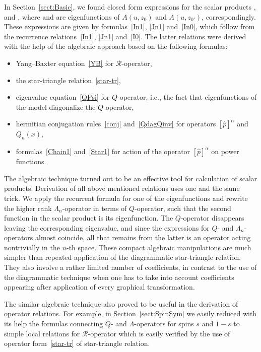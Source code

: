 \documentclass[10pt,a4paper]{amsart}
\numberwithin{equation}{section}
\begin{document}
In Section~\ref{sect:Basic}, we found closed form expressions for the scalar products
,
 and ,
where  and  are eigenfunctions of $A(u,z_0)$ and $A(u,z_{0'})$, correspondingly. These expressions are given by formulas~\eqref{In1}, \eqref{Jn1} and~\eqref{In0}, which follow from the
recurrence relations~\eqref{In1}, \eqref{Jn1} and~\eqref{I0}. The latter relations were derived with the help of the algebraic approach based on the following formulas:
\begin{itemize}\itemsep=0pt
	\item Yang--Baxter equation~\eqref{YB} for $\mathcal{R}$-operator,
	\item the star-triangle relation~\eqref{star-tr},
	\item eigenvalue equation~\eqref{QPsi} for $Q$-operator, i.e., the fact that eigenfunctions of the model diagonalize the $Q$-operator,
	\item hermitian conjugation rules~\eqref{conj} and~\eqref{QdagQinv} for operators $[\hat{p}]^\alpha$ and $Q_n(x)$,
	\item formulas~\eqref{Chain1} and~\eqref{Star1} for action of the operator $[\hat{p}]^\alpha$ on power functions.
\end{itemize}
The algebraic technique turned out to be an effective tool for calculation of scalar products. Derivation of all above mentioned relations uses one and the same trick. We apply the recurrent formula for one of the eigenfunctions and rewrite the higher rank $\Lambda_n$-operator in terms of $Q$-operator, such that the second function in the scalar product is its eigenfunction.
The $Q$-operator disappears leaving the corresponding eigenvalue, and since the expressions for $Q$- and $\Lambda_n$-operators almost coincide, all that remains from the latter is an operator acting nontrivially in the $n$-th space. These compact algebraic manipulations are much simpler than repeated application of the diagrammatic star-triangle relation. They also involve a rather limited number of coefficients, in contrast to the use of the diagrammatic technique when one has to take into account coefficients appearing after application of every graphical transformation.

The similar algebraic technique also proved to be useful in the derivation of operator relations. For example, in Section~\ref{sect:SpinSym} we easily reduced with its help the formulas connecting $Q$- and $\Lambda$-operators for spins $s$ and $1-s$ to simple local relations for $\mathcal{R}$-operator which is easily verified by the use of operator form~\eqref{star-tr} of star-triangle relation.
\end{document}
